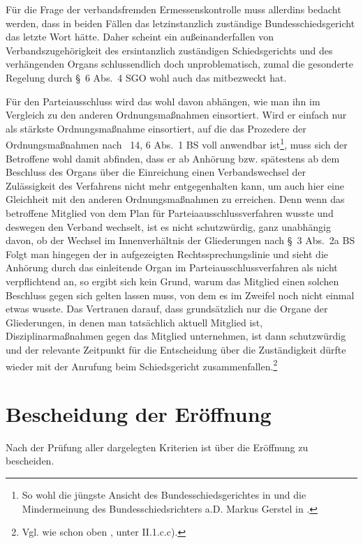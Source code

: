 Für die Frage der verbandsfremden Ermessenskontrolle muss allerdins bedacht werden, dass in beiden Fällen das letzinstanzlich zuständige Bundesschiedsgericht das letzte Wort hätte.
Daher scheint ein außeinanderfallen von Verbandszugehörigkeit des ersintanzlich zuständigen Schiedsgerichts und des verhängenden Organs schlussendlich doch unproblematisch, zumal die gesonderte Regelung durch \S~6 Abs.~4 SGO wohl auch das mitbezweckt hat.

Für den Parteiausschluss wird das wohl davon abhängen, wie man ihn im Vergleich zu den anderen Ordnungsmaßnahmen einsortiert. Wird er einfach nur als stärkste Ordnungsmaßnahme einsortiert, auf die das Prozedere der Ordnungsmaßnahmen nach \SSS~14, 6 Abs.~1 BS voll anwendbar ist\footnote{So wohl die jüngste Ansicht des Bundesschiedsgerichtes in \cite{BSG3615HS} und die Mindermeinung des Bundesschiedsrichters a.D. Markus Gerstel in \cite{BSG20131005}.}, muss sich der Betroffene wohl damit abfinden, dass er ab Anhörung  bzw. spätestens ab dem Beschluss des Organs über die Einreichung einen Verbandswechsel der Zulässigkeit des Verfahrens nicht mehr entgegenhalten kann, um auch hier eine Gleichheit mit den anderen Ordnungsmaßnahmen zu erreichen.
Denn wenn das betroffene Mitglied  von dem Plan für Parteiaausschlussverfahren wusste und deswegen den Verband wechselt, ist es nicht schutzwürdig, ganz unabhängig davon, ob der Wechsel im Innenverhältnis der Gliederungen nach \S~3 Abs.~2a BS
Folgt man hingegen der in \cite{BSG20131005} aufgezeigten Rechtssprechungslinie und sieht die Anhörung durch das einleitende Organ im Parteiausschlussverfahren als nicht verpflichtend an, so ergibt sich kein Grund, warum das Mitglied einen solchen Beschluss gegen sich gelten lassen muss, von dem es im Zweifel noch nicht einmal etwas wusste.
Das Vertrauen darauf, dass grundsätzlich nur die Organe der Gliederungen, in denen man tatsächlich aktuell Mitglied ist,  Disziplinarmaßnahmen gegen das Mitglied unternehmen, ist dann schutzwürdig und der relevante Zeitpunkt für die Entscheidung über die Zuständigkeit dürfte wieder mit der Anrufung beim Schiedsgericht zusammenfallen.\footnote{Vgl.  wie schon oben \cite[S. 9]{BSG115HS}, unter II.1.c.c).}

\section{Bescheidung der Eröffnung}
\label{Standardworkflow:Beschluss}
Nach der Prüfung aller dargelegten Kriterien ist über die Eröffnung zu bescheiden.

